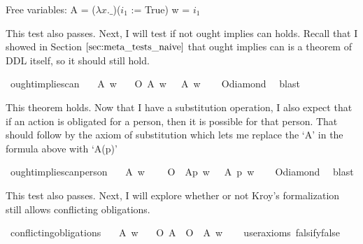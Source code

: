 \begin{isabellebody}
{  Free variables:
    A = ($\lambda x. \_$)($i_1$ := True)
    w = $i_1$ \color{black}%
}%
\endisatagproof
{\isafoldproof}%
%
\isadelimproof
%
\endisadelimproof
%
\begin{isamarkuptext}%
This test also passes. Next, I will test if not ought implies can holds. Recall that I 
        showed in Section $\ref{sec:meta_tests_naive}$ that ought implies can is a theorem of DDL itself, so it should still hold.%
\end{isamarkuptext}\isamarkuptrue%
\isamarkupfalse%
\ ought{\isacharunderscore}implies{\isacharunderscore}can{\isacharcolon}\isanewline
\ \ \ A\ w\isanewline
\ \ \ {\isachardoublequoteopen}O\ {\isacharbraceleft}A{\isacharbraceright}\ w\ {\isasymlongrightarrow}\ {\isasymdiamond}\ A\ w{\isachardoublequoteclose}\isanewline
%
\isadelimproof
\ \ %
\endisadelimproof
%
\isatagproof
{}\isamarkupfalse%
\ O{\isacharunderscore}diamond\ \isamarkupfalse%
\ blast%
\endisatagproof
{\isafoldproof}%
%
\isadelimproof
%
\endisadelimproof
%
\begin{isamarkuptext}%
This theorem holds. Now that I have a substitution operation, I also expect that if an action 
      is obligated for a person, then it is possible for that person. That should follow by the 
      axiom of substitution \cite{cresswell} which lets me replace the `A' in the formula above with 
      `A(p)'%
\end{isamarkuptext}\isamarkuptrue%
\isamarkupfalse%
\ ought{\isacharunderscore}implies{\isacharunderscore}can{\isacharunderscore}person{\isacharcolon}\isanewline
\ \ \ A\ w\ \isanewline
\ \ \ {\isachardoublequoteopen}O\ {\isacharbraceleft}\ A{\isacharparenleft}p{\isacharparenright}{\isacharbraceright}\ w\ {\isasymlongrightarrow}\ {\isasymdiamond}\ {\isacharparenleft}A\ {\isacharparenleft}p{\isacharparenright}{\isacharparenright}\ w{\isachardoublequoteclose}\isanewline
%
\isadelimproof
\ \ %
\endisadelimproof
%
\isatagproof
{}\isamarkupfalse%
\ O{\isacharunderscore}diamond\ \isamarkupfalse%
\ blast%
\endisatagproof
{\isafoldproof}%
%
\isadelimproof
%
\endisadelimproof
%
\begin{isamarkuptext}%
This test also passes. Next, I will explore whether or not Kroy's formalization still allows 
      conflicting obligations.%
\end{isamarkuptext}\isamarkuptrue%
\isamarkupfalse%
\ conflicting{\isacharunderscore}obligations{\isacharcolon}\isanewline
\ \ \ A\ w\isanewline
\ \ \ {\isachardoublequoteopen}{\isacharparenleft}O\ {\isacharbraceleft}A{\isacharbraceright}\ \isactrlbold {\isasymand}\ O\ {\isacharbraceleft}\isactrlbold {\isasymnot}\ A{\isacharbraceright}{\isacharparenright}\ w{\isachardoublequoteclose}\isanewline
\ \ \isamarkupfalse%
\ {\isacharbrackleft}user{\isacharunderscore}axioms{\isacharcomma}\ falsify{\isacharequal}false{\isacharbrackright}%
\isadelimproof
\ %
\endisadelimproof
%
\isatagproof
{}\isamarkupfalse%
\isanewline
%
\end{isabellebody}

